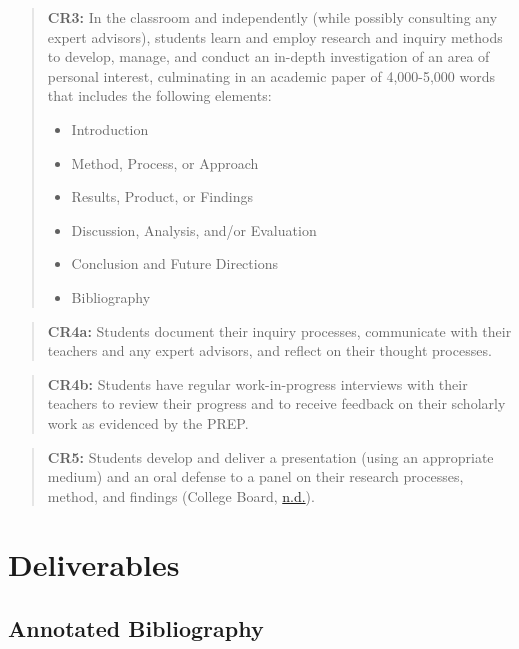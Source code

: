 \documentclass[11pt,]{article}
\providecommand{\tightlist}{%
  \setlength{\itemsep}{0pt}\setlength{\parskip}{0pt}}
\begin{document}
\begin{quote}
\textbf{CR3:} In the classroom and independently (while possibly consulting any expert advisors), students learn and employ research and inquiry methods to develop, manage, and conduct an in-depth investigation of an area of personal interest, culminating in an academic paper of 4,000-5,000 words that includes the following elements:

\begin{itemize}
\tightlist
\item
  Introduction
\item
  Method, Process, or Approach
\item
  Results, Product, or Findings
\item
  Discussion, Analysis, and/or Evaluation
\item
  Conclusion and Future Directions
\item
  Bibliography
\end{itemize}
\end{quote}

\begin{quote}
\textbf{CR4a:} Students document their inquiry processes, communicate with their teachers and any expert advisors, and reflect on their thought processes.
\end{quote}

\begin{quote}
\textbf{CR4b:} Students have regular work-in-progress interviews with their teachers to review their progress and to receive feedback on their scholarly work as evidenced by the PREP.
\end{quote}

\begin{quote}
\textbf{CR5:} Students develop and deliver a presentation (using an appropriate medium) and an oral defense to a panel on their research processes, method, and findings (College Board, \protect\hyperlink{ref-syllabus}{n.d.}).
\end{quote}

\hypertarget{deliverables}{%
\section{Deliverables}\label{deliverables}}

\hypertarget{annotated-bibliography}{%
\subsection{Annotated Bibliography}\label{annotated-bibliography}}
\end{document}
